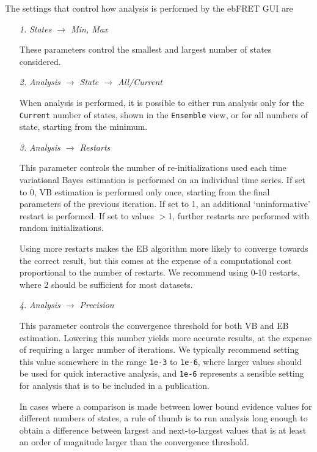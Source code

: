 \documentclass[12pt,article,oldfontcommands]{memoir}
\begin{document}
The settings that control how analysis is performed by the ebFRET GUI are
\begin{itemize}
\item[\emph{1.}] \emph{States $\to$ Min, Max}

These parameters control the smallest and largest number of states considered. 

\item[\emph{2.}] \emph{Analysis $\to$ State $\to$ All/Current}

When analysis is performed, it is possible to either run analysis only for the \texttt{Current} number of states, shown in the \texttt{Ensemble} view, or for all numbers of state, starting from the minimum. 

\item[\emph{3.}] \emph{Analysis $\to$ Restarts}

This parameter controls the number of re-initializations used each time variational Bayes estimation is performed on an individual time series. If set to 0, VB estimation is performed only once, starting from the final parameters of the previous iteration. If set to 1, an additional `uninformative' restart is performed. If set to values $>$1, further restarts are performed with random initializations.

Using more restarts makes the EB algorithm more likely to converge towards the correct result, but this comes at the expense of a computational cost proportional to the number of restarts. We recommend using 0-10 restarts, where 2 should be sufficient for most datasets.

\item[\emph{4.}] \emph{Analysis $\to$ Precision}

This parameter controls the convergence threshold for both VB and EB estimation. Lowering this number yields more accurate results, at the expense of requiring a larger number of iterations. We typically recommend setting this value somewhere in the range \texttt{1e-3} to \texttt{1e-6}, where larger values should be used for quick interactive analysis, and \texttt{1e-6} represents a sensible setting for analysis that is to be included in a publication.

In cases where a comparison is made between lower bound evidence values for different numbers of states, a rule of thumb is to run analysis long enough to obtain a difference between largest and next-to-largest values that is at least an order of magnitude larger than the convergence threshold.

\end{itemize}
\end{document}
